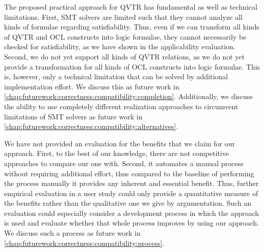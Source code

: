 
The proposed practical approach for \gls{QVTR} has fundamental as well as technical limitations.
First, \gls{SMT} solvers are limited such that they cannot analyze all kinds of formulae regarding satisfiability.
Thus, even if we can transform all kinds of \gls{QVTR} and \gls{OCL} constructs into logic formulae, they cannot necessarily be checked for satisfiability, as we have shown in the applicability evaluation.
Second, we do not yet support all kinds of \gls{QVTR} relations, as we do not yet provide a transformation for all kinds of \gls{OCL} constructs into logic formulae.
This is, however, only a technical limitation that can be solved by additional implementation effort.
We discuss this as future work in \autoref{chap:futurework:correctness:compatibility:completion}.
Additionally, we discuss the ability to use completely different realization approaches to circumvent limitations of \gls{SMT} solvers as future work in \autoref{chap:futurework:correctness:compatibility:alternatives}.

We have not provided an evaluation for the benefits that we claim for our approach.
First, to the best of our knowledge, there are not competitive approaches to compare our one with.
Second, it automates a manual process without requiring additional effort, thus compared to the baseline of performing the process manually it provides any inherent and essential benefit.
Thus, further empirical evaluation in a user study could only provide a quantitative measure of the benefits rather than the qualitative one we give by argumentation.
Such an evaluation could especially consider a development process in which the approach is used and evaluate whether that whole process improves by using our approach.
We discuss such a process as future work in \autoref{chap:futurework:correctness:compatibility:process}.

